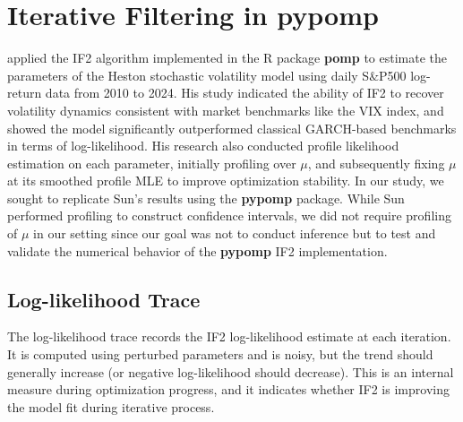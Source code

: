 \documentclass[11pt]{report}
\begin{document}
\chapter{Iterative Filtering in pypomp}\label{chap:pypompif2}
\citet{sunmodel} applied the IF2 algorithm implemented in the R package \textbf{pomp} to estimate the parameters of the Heston stochastic volatility model using daily S$\&$P500 log-return data from 2010 to 2024. His study indicated the ability of IF2 to recover volatility dynamics consistent with market benchmarks like the VIX index, and showed the model significantly outperformed classical GARCH-based benchmarks in terms of log-likelihood. His research also conducted profile likelihood estimation on each parameter, initially profiling over $\mu$, and subsequently fixing $\mu$ at its smoothed profile MLE to improve optimization stability. In our study, we sought to replicate Sun’s results using the \textbf{pypomp} package. While Sun performed profiling to construct confidence intervals, we did not require profiling of $\mu$ in our setting since our goal was not to conduct inference but to test and validate the numerical behavior of the \textbf{pypomp} IF2 implementation. 

\section{Log-likelihood Trace}\label{sec:ll_trace}
The log-likelihood trace records the IF2 log-likelihood estimate at each iteration. It is computed using perturbed parameters and is noisy, but the trend should generally increase (or negative log-likelihood should decrease). This is an internal measure during optimization progress, and it indicates whether IF2 is improving the model fit during iterative process.
\end{document}
